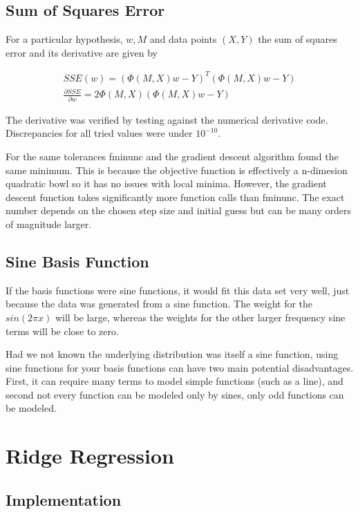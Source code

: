 \documentclass[10pt,twocolumn]{article}
\begin{document}
\subsection*{ Sum of Squares Error}
For a particular hypothesis, $w, M $ and data points $(X, Y)$ the sum of squares error and its derivative are given by

\begin{align}
SSE(w) = (\Phi(M, X) w - Y)^T(\Phi(M, X) w - Y)\\
\frac{\partial SSE}{\partial w}= 2 \Phi(M,X)(\Phi(M,X)w -Y) 
\end{align}

The derivative was verified by testing against the numerical derivative code. Discrepancies for all tried values were under $10^{-10}$. 

For the same tolerances fminunc and the gradient descent algorithm found the same minimum. This is because the objective function is effectively a n-dimesion quadratic bowl so it has no issues with local minima. However, the gradient descent function takes significantly more function calls than fminunc. The exact number depends on the chosen step size and initial guess but can be many orders of magnitude larger. 

\subsection*{ Sine Basis Function}
If the basis functions were sine functions, it would fit this data set very well, just because the data was generated from a sine function. The weight for the $sin(2 \pi x)$ will be large, whereas the weights for the other larger frequency sine terms will be close to zero.

Had we not known the underlying distribution was itself a sine function, using sine functions for your basis functions can have two main potential disadvantages. First, it can require many terms to model simple functions (such as a line), and second not every function can be modeled only by sines, only odd functions can be modeled.

\section{Ridge Regression}

\subsection*{ Implementation}
\end{document}
